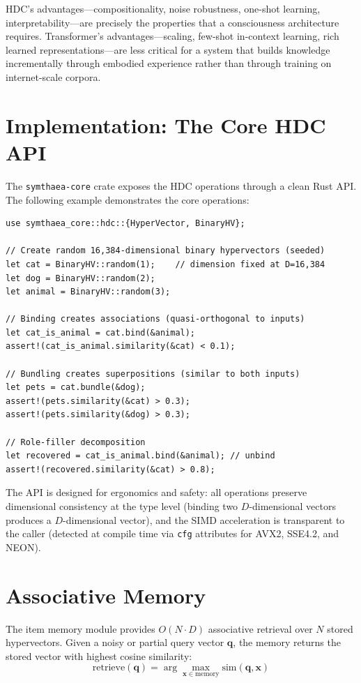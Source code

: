 \documentclass[12pt]{book}
\begin{document}
HDC's advantages---compositionality, noise robustness, one-shot learning, interpretability---are precisely the properties that a consciousness architecture requires. Transformer's advantages---scaling, few-shot in-context learning, rich learned representations---are less critical for a system that builds knowledge incrementally through embodied experience rather than through training on internet-scale corpora.

\section{Implementation: The Core HDC API}

The \texttt{symthaea-core} crate exposes the HDC operations through a clean Rust API. The following example demonstrates the core operations:

\begin{lstlisting}[caption={Core HDC operations in Symthaea.},label=lst:hdc-api]
use symthaea_core::hdc::{HyperVector, BinaryHV};

// Create random 16,384-dimensional binary hypervectors (seeded)
let cat = BinaryHV::random(1);    // dimension fixed at D=16,384
let dog = BinaryHV::random(2);
let animal = BinaryHV::random(3);

// Binding creates associations (quasi-orthogonal to inputs)
let cat_is_animal = cat.bind(&animal);
assert!(cat_is_animal.similarity(&cat) < 0.1);

// Bundling creates superpositions (similar to both inputs)
let pets = cat.bundle(&dog);
assert!(pets.similarity(&cat) > 0.3);
assert!(pets.similarity(&dog) > 0.3);

// Role-filler decomposition
let recovered = cat_is_animal.bind(&animal); // unbind
assert!(recovered.similarity(&cat) > 0.8);
\end{lstlisting}

The API is designed for ergonomics and safety: all operations preserve dimensional consistency at the type level (binding two $D$-dimensional vectors produces a $D$-dimensional vector), and the SIMD acceleration is transparent to the caller (detected at compile time via \texttt{cfg} attributes for AVX2, SSE4.2, and NEON).

\section{Associative Memory}

The item memory module provides $O(N \cdot D)$ associative retrieval over $N$ stored hypervectors. Given a noisy or partial query vector $\mathbf{q}$, the memory returns the stored vector with highest cosine similarity:
\begin{equation}
\text{retrieve}(\mathbf{q}) = \arg\max_{\mathbf{x} \in \text{memory}} \text{sim}(\mathbf{q}, \mathbf{x})
\end{equation}
\end{document}
